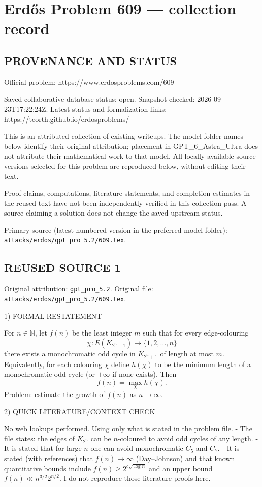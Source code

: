 \section*{Erd\H{o}s Problem 609 --- collection record}

\subsection*{PROVENANCE AND STATUS}
Official problem: https://www.erdosproblems.com/609

Saved collaborative-database status: open.
Snapshot checked: 2026-09-23T17:22:24Z.
Latest status and formalization links: https://teorth.github.io/erdosproblems/

This is an attributed collection of existing writeups. The model-folder names below identify their original attribution; placement in GPT\_6\_Astra\_Ultra does not attribute their mathematical work to that model. All locally available source versions selected for this problem are reproduced below, without editing their text.

Proof claims, computations, literature statements, and completion estimates in the reused text have not been independently verified in this collection pass. A source claiming a solution does not change the saved upstream status.

Primary source (latest numbered version in the preferred model folder): \texttt{attacks/erdos/gpt\_pro\_5.2/609.tex}.

\subsection*{REUSED SOURCE 1}
Original attribution: \texttt{gpt\_pro\_5.2}.
Original file: \texttt{attacks/erdos/gpt\_pro\_5.2/609.tex}.


1) FORMAL RESTATEMENT

For $n\in\mathbb N$, let $f(n)$ be the least integer $m$ such that for every edge-colouring
\[
\chi:E(K_{2^n+1})\to\{1,2,\dots,n\}
\]
there exists a monochromatic odd cycle in $K_{2^n+1}$ of length at most $m$.
Equivalently, for each colouring $\chi$ define $h(\chi)$ to be the minimum length of a monochromatic odd cycle (or $+\infty$ if none exists). Then
\[
f(n)=\max_{\chi} h(\chi).
\]
Problem: estimate the growth of $f(n)$ as $n\to\infty$.

2) QUICK LITERATURE/CONTEXT CHECK

No web lookups performed. Using only what is stated in the problem file.
- The file states: the edges of $K_{2^n}$ can be $n$-coloured to avoid odd cycles of any length.
- It is stated that for large $n$ one can avoid monochromatic $C_5$ and $C_7$.
- It is stated (with references) that $f(n)\to\infty$ (Day--Johnson) and that known quantitative bounds include
  $f(n)\ge 2^{c\sqrt{\log n}}$ and an upper bound $f(n)\ll n^{3/2}2^{n/2}$.
I do not reproduce those literature proofs here.

